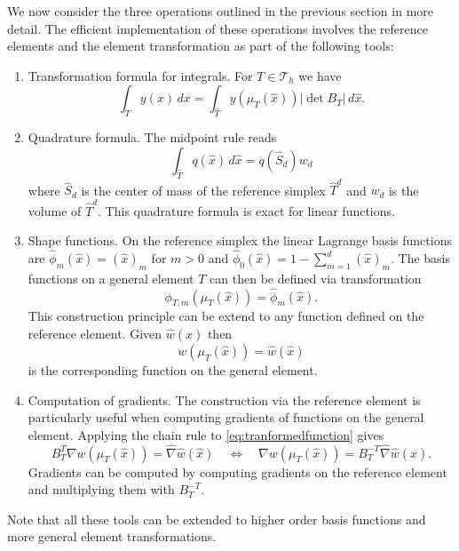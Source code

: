 \documentclass[a4paper,12pt]{article}
\begin{document}
We now consider the three operations outlined in the previous section
in more detail. The efficient implementation of these operations involves
the reference elements and the element transformation as part of the following
tools:
\begin{enumerate}[Tool 1)]
\item Transformation formula for integrals. For $T\in\mathcal{T}_h$ we have
\begin{equation*}
\int_T y(x)\,dx = \int_{\hat T} y(\mu_T(\hat x)) |\det B_T| \,d\hat x .
\end{equation*}
\item Quadrature formula. The midpoint rule reads
\begin{equation*}
\int_{\hat T} q(\hat x) \,d\hat x = q(\hat S_d) w_d
\end{equation*}
where $\hat S_d$ is the center of mass of the reference simplex $\hat T^d$
and $w_d$ is the volume of $\hat T^d$. This quadrature formula is exact for linear
functions.
\item Shape functions. On the reference simplex the linear Lagrange
basis functions are $\hat\phi_m(\hat x) = (\hat x)_m$ for $m>0$ and 
$\hat\phi_0(\hat x) = 1-\sum_{m=1}^d (\hat x)_m$. The basis functions
on a general element $T$ can then be defined via transformation
\begin{equation*}
\phi_{T,m}(\mu_T(\hat x)) = \hat\phi_m(\hat x) .
\end{equation*}
This construction principle can be extend to any function defined on the
reference element. Given $\hat w(\hat x)$ then 
\begin{equation}
w(\mu_T(\hat x))=\hat w(\hat x)
\label{eq:tranformedfunction}
\end{equation}
is the corresponding function on the general element.
\item Computation of gradients. The construction via the reference element
is particularly useful when computing gradients of functions on the general element.
Applying the chain rule to \eqref{eq:tranformedfunction} gives
\begin{equation*}
B_T^T \nabla w(\mu_T(\hat x)) = \hat\nabla \hat w(\hat x) \quad\Leftrightarrow\quad
\nabla w(\mu_T(\hat x)) = B_T^{-T}\hat\nabla \hat w(\hat x) .
\end{equation*}
Gradients can be computed by computing gradients on the reference element
and multiplying them with $B_T^{-T}$.
\end{enumerate}
Note that all these tools can be extended to higher order basis functions
and more general element transformations.
\end{document}
